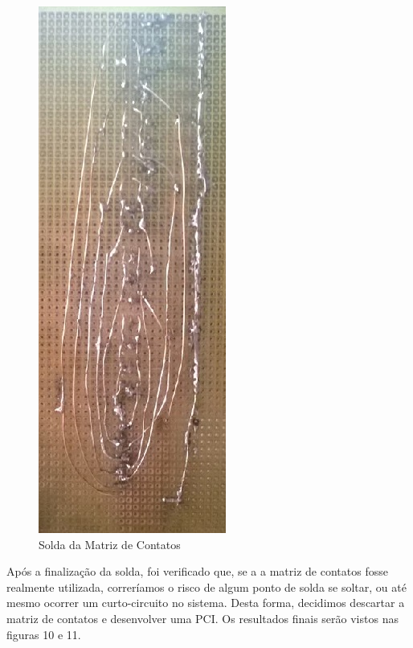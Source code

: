 \begin{figure}[!h]
	\centering
	\includegraphics{./placa_baixo.jpg}
	\caption[Solda da Matriz de Contatos]{Solda da Matriz de Contatos}
	\label{fig:placa_cima}
\end{figure}

Após a finalização da solda, foi verificado que, se a a matriz de contatos fosse realmente utilizada, correríamos o risco de algum ponto de solda se soltar, ou até mesmo ocorrer um curto-circuito no sistema. Desta forma, decidimos descartar a matriz de contatos e desenvolver uma PCI. Os resultados finais serão vistos nas figuras 10 e 11.

